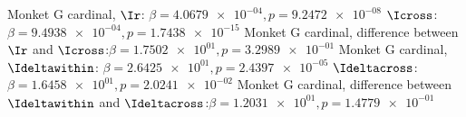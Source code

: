 Monket G cardinal, $\Ir$: $\beta = \num{4.0679e-04}, p = \num{9.2472e-08}$ 
 $\Icross$: $\beta = \num{9.4938e-04}, p = \num{1.7438e-15}$ 
Monket G cardinal, difference between $\Ir$ and $\Icross$:$\beta = \num{1.7502e+01}, p = \num{3.2989e-01}$ 
Monket G cardinal, $\Ideltawithin$: $\beta = \num{2.6425e+01}, p = \num{2.4397e-05}$ 
 $\Ideltacross$: $\beta = \num{1.6458e+01}, p = \num{2.0241e-02}$ 
Monket G cardinal, difference between $\Ideltawithin$ and $\Ideltacross$:$\beta = \num{1.2031e+01}, p = \num{1.4779e-01}$ 
